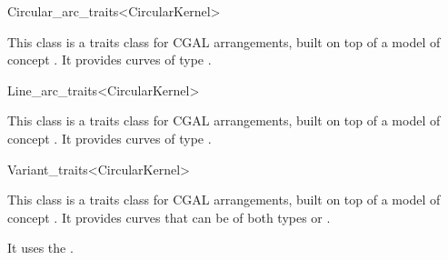 \begin{ccRefClass}{Circular_arc_traits<CircularKernel>}

\ccDefinition

This class is a traits class for CGAL arrangements, built on top of a model of 
concept .
It provides curves of type .

\ccIsModel
{}

\end{ccRefClass}
\begin{ccRefClass}{Line_arc_traits<CircularKernel>}

\ccDefinition

This class is a traits class for CGAL arrangements, built on top of  a model of 
concept . 
It provides curves of type . 

\ccIsModel
{}

\end{ccRefClass}
\begin{ccRefClass}{Variant_traits<CircularKernel>}

\ccDefinition

This class is a traits class for CGAL arrangements, built on top of  a model of 
concept . 
It provides curves that can be of both types 
 or 
.

It uses the . 

\ccIsModel
{}

\end{ccRefClass}
